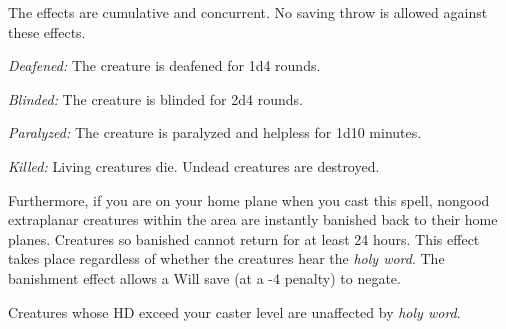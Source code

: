 The effects are cumulative and concurrent. No saving throw is allowed against these 
effects.

\textit{Deafened:} The creature is deafened for 1d4 rounds.

\textit{Blinded:} The creature is blinded for 2d4 rounds.

\textit{Paralyzed:} The creature is paralyzed and helpless for 1d10 minutes.

\textit{Killed:} Living creatures die. Undead creatures are destroyed.

Furthermore, if you are on your home plane when you cast this spell, nongood extraplanar 
creatures within the area are instantly banished back to their home planes. Creatures 
so banished cannot return for at least 24 hours. This effect takes place regardless 
of whether the creatures hear the \textit{holy word}. The banishment effect allows 
a Will save (at a -4 penalty) to negate.

Creatures whose HD exceed your caster level are unaffected by \textit{holy word}.

